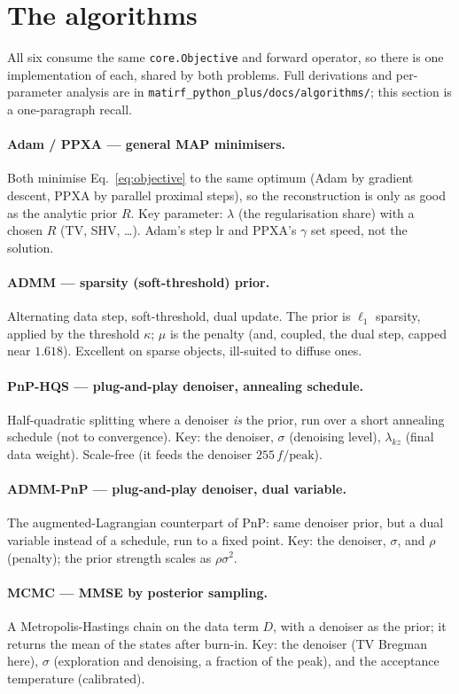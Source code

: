 \section{The algorithms}
\label{sec:algorithms}

All six consume the same \texttt{core.Objective} and forward operator, so there is one
implementation of each, shared by both problems. Full derivations and per-parameter analysis are
in \texttt{matirf\_python\_plus/docs/algorithms/}; this section is a one-paragraph recall.

\paragraph{Adam / PPXA --- general MAP minimisers.}
Both minimise Eq.~\eqref{eq:objective} to the same optimum (Adam by gradient descent, PPXA by
parallel proximal steps), so the reconstruction is only as good as the analytic prior $R$. Key
parameter: $\lambda$ (the regularisation share) with a chosen $R$ (TV, SHV, \dots). Adam's step
$\text{lr}$ and PPXA's $\gamma$ set speed, not the solution.

\paragraph{ADMM --- sparsity (soft-threshold) prior.}
Alternating data step, soft-threshold, dual update. The prior is $\ell_1$ sparsity, applied by
the threshold $\kappa$; $\mu$ is the penalty (and, coupled, the dual step, capped near $1.618$).
Excellent on sparse objects, ill-suited to diffuse ones.

\paragraph{PnP-HQS --- plug-and-play denoiser, annealing schedule.}
Half-quadratic splitting where a denoiser \emph{is} the prior, run over a short annealing
schedule (not to convergence). Key: the denoiser, $\sigma$ (denoising level), $\lambda_{kz}$
(final data weight). Scale-free (it feeds the denoiser $255\,f/\text{peak}$).

\paragraph{ADMM-PnP --- plug-and-play denoiser, dual variable.}
The augmented-Lagrangian counterpart of PnP: same denoiser prior, but a dual variable instead of
a schedule, run to a fixed point. Key: the denoiser, $\sigma$, and $\rho$ (penalty); the prior
strength scales as $\rho\sigma^2$.

\paragraph{MCMC --- MMSE by posterior sampling.}
A Metropolis-Hastings chain on the data term $D$, with a denoiser as the prior; it returns the
mean of the states after burn-in. Key: the denoiser (TV Bregman here), $\sigma$ (exploration
and denoising, a fraction of the peak), and the acceptance temperature (calibrated).
